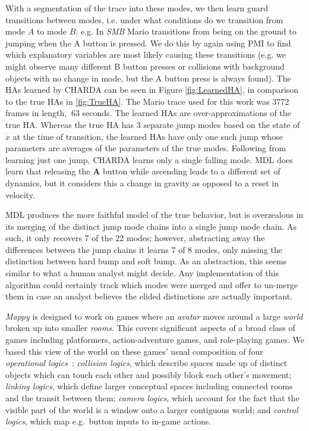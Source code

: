 \documentclass[a4paper]{article}
\begin{document}
With a segmentation of the trace into these modes, we then learn guard transitions between modes, i.e. under what conditions do we transition from mode $A$ to mode $B$. e.g. In \textit{SMB} Mario transitions from being on the ground to jumping when the A button is pressed. We do this by again using PMI to find which explanatory variables are most likely causing these transitions (e.g. we might observe many different B button presses or collisions with background objects with no change in mode, but the A button press is always found). The HAs learned by CHARDA can be seen in Figure \ref{fig:LearnedHA}, in comparison to the true HAs in \ref{fig:TrueHA}.  The Mario trace used for this work was 3772 frames in length, $~63$ seconds.  The learned HAs are over-approximations of the true HA.  Whereas the true HA has 3 separate jump modes based on the state of $\dot{x}$ at the time of transition, the learned HAs have only one such jump whose parameters are averages of the parameters of the true modes.  Following from learning just one jump, CHARDA learns only a single falling mode.  MDL does learn that releasing the \textbf{A} button while ascending leads to a different set of dynamics, but it considers this a change in gravity as opposed to a reset in velocity.

MDL produces the more faithful model of the true behavior, but is overzealous in its merging of the distinct jump mode chains into a single jump mode chain. As such, it only recovers 7 of the 22 modes; however, abstracting away the differences between the jump chains it learns 7 of 8 modes, only missing the distinction between hard bump and soft bump. 
As an abstraction, this seems similar to what a human analyst might decide.
Any implementation of this algorithm could certainly track which modes were merged and offer to un-merge them in case an analyst believes the elided distinctions are actually important.


\emph{Mappy} is designed to work on games where an \emph{avatar} moves around a large \emph{world} broken up into smaller \emph{rooms}.
This covers significant aspects of a broad class of games including platformers, action-adventure games, and role-playing games.
We based this view of the world on these games' usual composition of four \emph{operational logics}~\cite{wardrip-fruin2005playable,osborn2017refining}: \emph{collision logics}, which describe spaces made up of distinct objects which can touch each other and possibly block each other's movement; \emph{linking logics}, which define larger conceptual spaces including connected rooms and the transit between them; \emph{camera logics}, which account for the fact that the visible part of the world is a window onto a larger contiguous world; and \emph{control logics}, which map e.g.\ button inputs to in-game actions.
\end{document}
